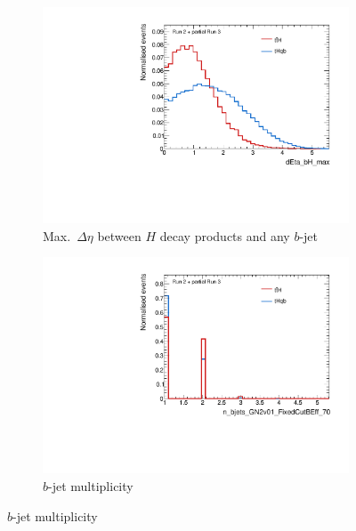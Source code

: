 \begin{figure}[htbp]
  \centering
  \begin{subfigure}[b]{0.45\textwidth}
    \centering
    \includegraphics[width=\textwidth]{images/plots_tH_tHqb_for_thesis/dEta_bH_max_signals_ATLAS.pdf}
    \caption{Max.\ $\Delta \eta$ between $H$ decay products and any $b$-jet}
    \label{fig:dEta_bH_max}
  \end{subfigure}
  \hfill
  \begin{subfigure}[b]{0.45\textwidth}
    \centering
    \includegraphics[width=\textwidth]{images/plots_tH_tHqb_for_thesis/n_bjets_GN2v01_FixedCutBEff_70_signals_ATLAS.pdf}
    \caption{$b$-jet multiplicity}
    \label{fig:n_bjets}
  \end{subfigure}


\end{figure}
